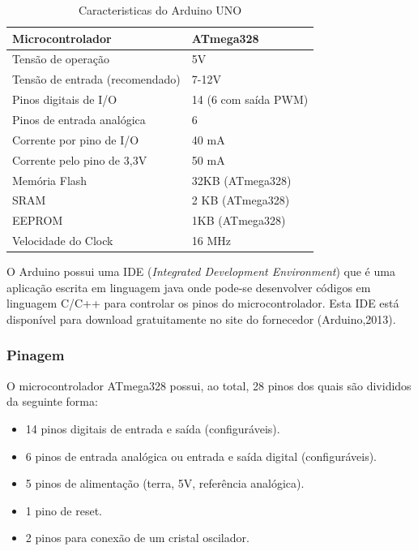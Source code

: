 \begin{table}[!hbt] 
   \centering   %
   \setlength{\arrayrulewidth}{1\arrayrulewidth}
   \setlength{\belowcaptionskip}{5pt}
   
   \caption{Caracteristicas do Arduino UNO}
   \begin{tabular}{l|l} %
      \hline
      Microcontrolador & ATmega328 \\
      \hline
      Tensão de operação & 5V  \\
      \hline
      Tensão de entrada (recomendado)  & 7-12V \\
      \hline
      Pinos digitais de I/O	& 14 (6 com saída PWM) \\
      \hline
      Pinos de entrada analógica &	6\\
      \hline
      Corrente por pino de I/O &	40 mA\\
      \hline
      Corrente pelo pino de 3,3V&	50 mA\\
      \hline
      Memória Flash & 32KB (ATmega328)\\
      \hline
      SRAM & 2 KB (ATmega328)\\
      \hline
      EEPROM & 1KB (ATmega328)\\
      \hline
      Velocidade do Clock & 16 MHz\\
   \end{tabular}
   \label{Características do Arduino UNO}
\end{table}

O Arduino possui uma IDE (\textit{Integrated Development Environment}) que é uma aplicação escrita em linguagem java onde pode-se desenvolver códigos em linguagem C/C++ para controlar os pinos do microcontrolador. Esta IDE está disponível para download gratuitamente no site do fornecedor (Arduino,2013).



\subsubsection{Pinagem}
O microcontrolador ATmega328 possui, ao total, 28 pinos dos quais são divididos da seguinte forma:

\begin{itemize}
\item	14 pinos digitais de entrada e saída (configuráveis).
\item	6 pinos de entrada analógica ou entrada e saída digital     (configuráveis).
\item	5 pinos de alimentação (terra, 5V, referência analógica).
\item	1 pino de reset.
 \item   2 pinos para conexão de um cristal oscilador.
\end{itemize}

